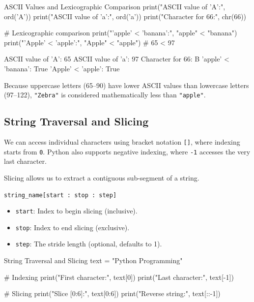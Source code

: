 \begin{pythoncode}[]{ASCII Values and Lexicographic Comparison}
print("ASCII value of 'A':", ord('A'))
print("ASCII value of 'a':", ord('a'))
print("Character for 66:", chr(66))

# Lexicographic comparison
print("'apple' < 'banana':", "apple" < "banana")
print("'Apple' < 'apple':", "Apple" < "apple")  # 65 < 97
\end{pythoncode}

\begin{outputbox}
ASCII value of 'A': 65
ASCII value of 'a': 97
Character for 66: B
'apple' < 'banana': True
'Apple' < 'apple': True
\end{outputbox}

Because uppercase letters (65--90) have lower ASCII values than lowercase letters (97--122), \texttt{"Zebra"} is considered mathematically less than \texttt{"apple"}.

\subsection{String Traversal and Slicing}

We can access individual characters using bracket notation \texttt{[]}, where indexing starts from \texttt{0}. Python also supports negative indexing, where \texttt{-1} accesses the very last character.

Slicing allows us to extract a contiguous sub-segment of a string.
\begin{syntaxbox}
\texttt{string\_name[start : stop : step]}
\begin{itemize}
    \item \texttt{start}: Index to begin slicing (inclusive).
    \item \texttt{stop}: Index to end slicing (exclusive).
    \item \texttt{step}: The stride length (optional, defaults to 1).
\end{itemize}
\end{syntaxbox}

\begin{pythoncode}[]{String Traversal and Slicing}
text = "Python Programming"

# Indexing
print("First character:", text[0])
print("Last character:", text[-1])

# Slicing
print("Slice [0:6]:", text[0:6])
print("Reverse string:", text[::-1])
\end{pythoncode}

